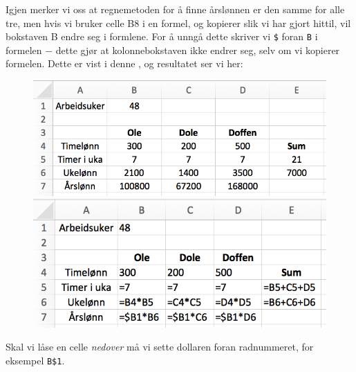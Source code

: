 Igjen merker vi oss at regnemetoden for å finne årslønnen er den samme for alle tre, men hvis vi bruker celle B8 i en formel, og kopierer slik vi har gjort hittil, vil bokstaven B endre seg i formlene. For å unngå dette skriver vi {\tt \$} foran {\tt B} i formelen $ - $ dette gjør at kolonnebokstaven ikke endrer seg, selv om vi kopierer formelen. Dette er vist i denne , og resultatet ser vi her:
\begin{figure}[H]
	\centering
	\includegraphics[scale=0.3]{figs/ex12}\\[5pt]
	\includegraphics[scale=0.3]{figs/ex13}
\end{figure}
Skal vi låse en celle \textsl{nedover} må vi sette dollaren foran radnummeret, for eksempel {\tt{B\$1}}.
